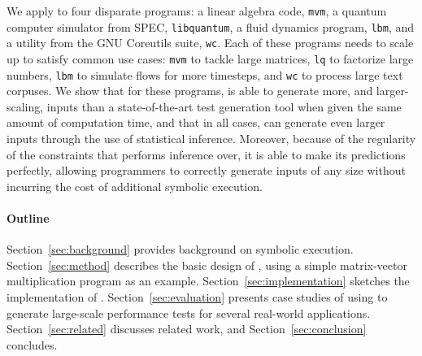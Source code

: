 We apply \lancet to four disparate programs: a linear algebra code, {\tt mvm}, a quantum computer simulator from SPEC, {\tt libquantum}, a fluid dynamics program, {\tt lbm}, and a utility from the GNU Coreutils suite, {\tt wc}.
Each of these programs needs to scale up to satisfy common use cases: {\tt mvm} to tackle large matrices, {\tt lq} to factorize large numbers, {\tt lbm} to simulate flows for more timesteps, and {\tt wc} to process large text corpuses.
We show that for these programs, \lancet is able to generate more, and larger-scaling, inputs than a state-of-the-art test generation tool when given the same amount of computation time, and that in all cases, \lancet can generate even larger inputs through the use of statistical inference.
Moreover, because of the regularity of the constraints that \lancet performs inference over, it is able to make its predictions perfectly, allowing programmers to correctly generate inputs of any size without incurring the cost of additional symbolic execution.

\paragraph{Outline}
Section~\ref{sec:background} provides background on symbolic execution.
Section~\ref{sec:method} describes the basic design of \lancet, using a simple matrix-vector multiplication program as an example.
Section~\ref{sec:implementation} sketches the implementation of \lancet.
Section~\ref{sec:evaluation} presents case studies of using \lancet to generate large-scale performance tests for several real-world applications.
Section~\ref{sec:related} discusses related work, and
Section~\ref{sec:conclusion} concludes.









